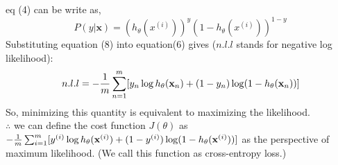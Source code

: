 \documentclass[12pt]{article}%
\begin{document}
eq (4) can be write as,
\begin{equation}
	P(y | \mathbf{x})=  (h_\theta (x^{(i)}))^y (1 - h_\theta (x^{(i)}))^{1-y}
\end{equation}
Substituting equation (8) into equation(6) gives ($n.l.l$ stands for negative log likelihood):
\begin{equation}
	n.l.l = - {1 \over m } \sum_{n=1}^{m} [y_n \log h_\theta (\mathbf{x}_n) + (1 - y_n )\log (1 - h_\theta (\mathbf{x}_n))]
\end{equation}
So, minimizing this quantity is equivalent to maximizing the likelihood. \\
$\therefore$ we can define the cost function $J(\theta)$ as $- {1 \over m } \sum_{i=1}^{m} [y^{(i)} \log h_\theta (\mathbf{x}^{(i)}) + (1 - y^{(i)})\log (1 - h_\theta (\mathbf{x}^{(i)}))]$ as the perspective of maximum likelihood. (We call this function as cross-entropy loss.)
\end{document}
